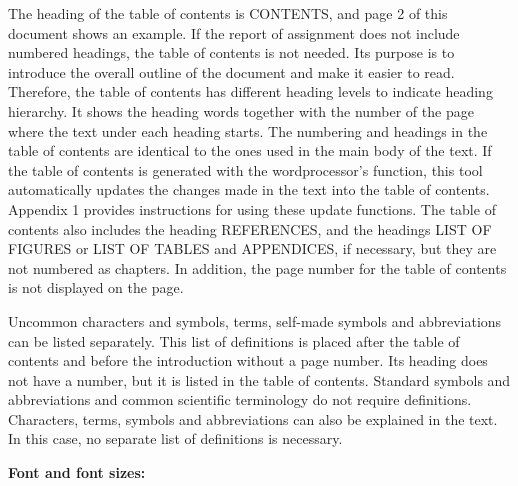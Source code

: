 \documentclass{article}
\begin{document}
The heading of the table of contents is CONTENTS, and page 2 of this document shows an example. If the report of assignment does not include numbered headings, the table of contents is not needed. Its purpose is to introduce the overall outline of the document and make it easier to read. Therefore, the table of contents has different heading levels to indicate heading hierarchy. It shows the heading words together with the number of the page where the text under each heading starts. The numbering and headings in the table of contents are identical to the ones used in the main body of the text. If the table of contents is generated with the wordprocessor’s function, this tool automatically updates the changes made in the text into the table of contents. Appendix 1 provides instructions for using these update functions. The table of contents also includes the heading REFERENCES, and the headings LIST OF FIGURES or LIST OF TABLES and APPENDICES, if necessary, but they are not numbered as chapters. In addition, the page number for the table of contents is not displayed on the page.

Uncommon characters and symbols, terms, self-made symbols and abbreviations can be listed separately. This list of definitions is placed after the table of contents and before the introduction without a page number. Its heading does not have a number, but it is listed in the table of contents. Standard symbols and abbreviations and common scientific terminology do not require definitions. Characters, terms, symbols and abbreviations can also be explained in the text. In this case, no separate list of definitions is necessary.


\textbf{Font and font sizes:}
\end{document}
